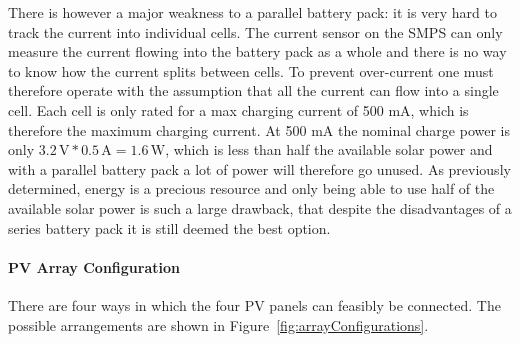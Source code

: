 \documentclass[a4paper]{article}
\newcommand{\unit}[1]{\ensuremath{\, \mathrm{#1}}}
\begin{document}
There is however a major weakness to a parallel battery pack: it is 
very hard to track the current into individual cells. The current 
sensor on the SMPS can only measure the current flowing into the 
battery pack as a whole and there is no way to know how the 
current splits between cells. To prevent over-current one must 
therefore operate with the assumption that all the current can 
flow into a single cell. Each cell is only rated for a max charging 
current of 500 mA\cite{batteryDatasheet}, which is therefore the 
maximum charging current. At 500 mA the nominal charge power is 
only \(3.2 \unit{V} * 0.5 \unit{A} = 1.6 \unit{W} \), which is 
less than half the available solar power and with a parallel 
battery pack a lot of power will therefore go unused. As 
previously determined, energy is a precious resource and only 
being able to use half of the available solar power is such a 
large drawback, that despite the disadvantages of a series battery 
pack it is still deemed the best option.

\paragraph*{PV Array Configuration}
There are four ways in which the four PV panels can feasibly be connected. 
The possible arrangements are shown in Figure~\ref{fig:arrayConfigurations}.
\end{document}
